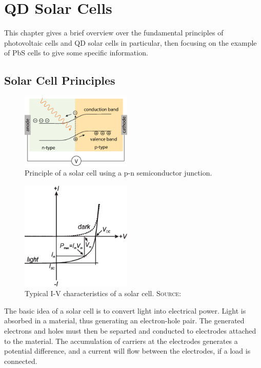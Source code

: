 \chapter{QD Solar Cells}

This chapter gives a brief overview over the fundamental principles of photovoltaic cells and QD solar cells in particular, then focusing on the example of PbS cells to give some specific information.

\section{Solar Cell Principles}

\begin{figure}
	\centering
	\includegraphics[width=200px]{Fig/SolarCell/pnSolarCell}
	\caption{Principle of a solar cell using a p-n semiconductor junction.}
	\label{fig:pnSolarCell}
\end{figure}

\begin{figure}
	\centering
	\includegraphics[width=200px]{Fig/SolarCell/IVsolarCell}
	\caption{Typical I-V characteristics of a solar cell. \scshape{Source:} \cite[p.427]{Talapin}}
	\label{fig:IVsolarCell}
\end{figure}

The basic idea of a solar cell is to convert light into electrical power. Light is absorbed in a material, thus generating an electron-hole pair. The generated electrons and holes must then be separted and conducted to electrodes attached to the material. The accumulation of carriers at the electrodes generates a potential difference, and a current will flow between the electrodes, if a load is connected.

